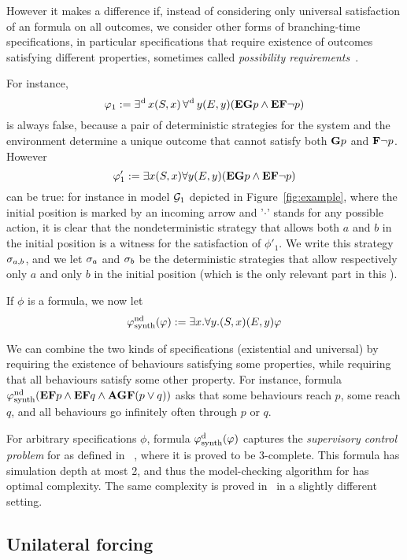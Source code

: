 However it makes a difference if, instead of considering only
universal satisfaction of an \LTL formula on all outcomes, we consider
other forms of branching-time specifications, in particular
specifications that require existence of outcomes satisfying different
properties, sometimes called \emph{possibility
  requirements}~\cite{kupferman1997module}.


For instance, \[\varphi_1 := \operatorname*{\exists^{\hskip.5pt\text{d}}} x (S,x) \operatorname*{\forall^{\hskip.5pt\text{d}}} y (E,y)({\bf E} {\bf G} p
  \wedge {\bf E} {\bf F} \neg p)\]
is always false, because a pair of
deterministic strategies for the system and the environment determine a unique
outcome that cannot satisfy both ${\bf G} p$ and ${\bf F}\neg p$.
However
\[\varphi'_1:=\exists x (S,x) \forall y (E,y) ({\bf E} {\bf G} p
  \wedge {\bf E} {\bf F} \neg p)\]
 can be true: for instance in model $\CGS_1$ depicted in Figure~\ref{fig:example}, where the
initial position is marked by an incoming arrow and  '$\cdot$' stands
for any possible action, it is clear that the nondeterministic
strategy that allows both $a$ and $b$ in the initial position is a
witness for the satisfaction of $\phi'_1$. We write this strategy
$\sigma_{a,b}$, and we let $\sigma_a$ and $\sigma_b$ be the
deterministic strategies that allow respectively only $a$ and only $b$
in the initial position (which is the only relevant part in this \CGS).

If $\phi$ is a \CTLs formula, we now let
\[\varphi^{\text{nd}}_{\text{synth}}(\varphi):=\exists x.   \forall y.
 (S,x)(E,y) \varphi\]

We can combine the two kinds of specifications (existential and universal) by  requiring the
existence of behaviours satisfying some properties, while requiring
that all  behaviours satisfy some other property.
For instance, formula
$\varphi^{\text{nd}}_{\text{synth}}({\bf E} {\bf F} p \wedge {\bf E} {\bf F}
  q \wedge {\bf A} {\bf G} {\bf F} (p\vee q))$
  asks that some behaviours 
 reach $p$, some  reach $q$, and all behaviours go infinitely
 often through $p$ or $q$.

For arbitrary \CTLs specifications $\phi$,  formula $\varphi^{\text{d}}_{\text{synth}}(\varphi)$ captures the
\emph{supervisory control problem} for \CTLs as defined in
~\cite{KMTV00}, where it is proved to be 3\EXPTIME-complete.
This formula has simulation depth at most 2,
  and thus the model-checking algorithm for \SLref has
  optimal complexity. The same complexity is proved
  in~\cite{jiang2006supervisory} in a slightly different setting.

  \subsection{Unilateral forcing}
  \label{sec-forcing}
  
